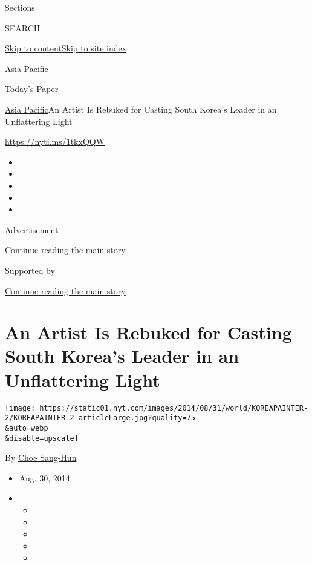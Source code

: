 Sections

SEARCH

\protect\hyperlink{site-content}{Skip to
content}\protect\hyperlink{site-index}{Skip to site index}

\href{https://www.nytimes.com/section/world/asia}{Asia Pacific}

\href{https://myaccount.nytimes.com/auth/login?response_type=cookie\&client_id=vi}{}

\href{https://www.nytimes.com/section/todayspaper}{Today's Paper}

\href{/section/world/asia}{Asia Pacific}\textbar{}An Artist Is Rebuked
for Casting South Korea's Leader in an Unflattering Light

\url{https://nyti.ms/1tkxQQW}

\begin{itemize}
\item
\item
\item
\item
\item
\end{itemize}

Advertisement

\protect\hyperlink{after-top}{Continue reading the main story}

Supported by

\protect\hyperlink{after-sponsor}{Continue reading the main story}

\hypertarget{an-artist-is-rebuked-for-casting-south-koreas-leader-in-an-unflattering-light}{%
\section{An Artist Is Rebuked for Casting South Korea's Leader in an
Unflattering
Light}\label{an-artist-is-rebuked-for-casting-south-koreas-leader-in-an-unflattering-light}}

\texttt{[image: https://static01.nyt.com/images/2014/08/31/world/KOREAPAINTER-2/KOREAPAINTER-2-articleLarge.jpg?quality=75\\\&auto=webp\\\&disable=upscale]}

By \href{http://www.nytimes.com/by/choe-sang-hun}{Choe Sang-Hun}

\begin{itemize}
\item
  Aug. 30, 2014
\item
  \begin{itemize}
  \item
  \item
  \item
  \item
  \item
  \end{itemize}
\end{itemize}

